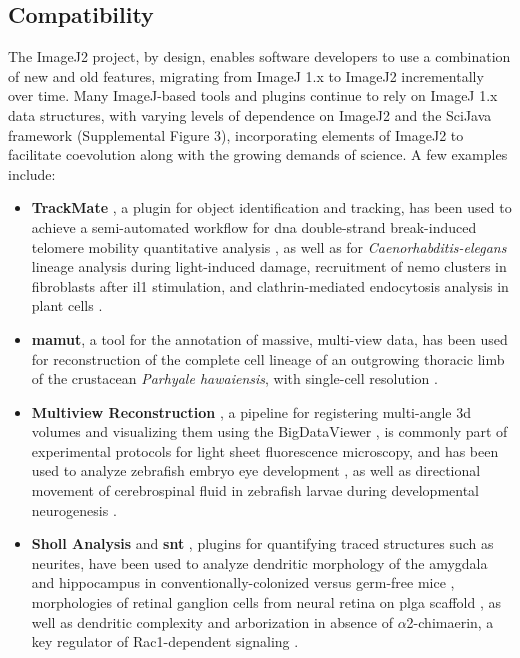 \documentclass{bmcart}
\begin{document}
\subsection*{Compatibility}
The ImageJ2 project, by design, enables software developers to use a
combination of new and old features, migrating from ImageJ 1.x to ImageJ2
incrementally over time. Many ImageJ-based tools and plugins continue to rely
on ImageJ 1.x data structures, with varying levels of dependence on ImageJ2 and
the SciJava framework (Supplemental Figure 3), incorporating elements of
ImageJ2 to facilitate coevolution along with the growing demands of science. A
few examples include:

\begin{itemize}
  \item \textbf{TrackMate} \cite{trackmate}, a plugin for object
    identification and tracking, has been used to achieve a semi-automated
    workflow for \acrfull{dna} double-strand break-induced telomere mobility
    quantitative analysis \cite{science_trackmate}, as well as for
    \textit{Caenorhabditis-elegans} lineage analysis during light-induced
    damage, recruitment of \acrfull{nemo} clusters in fibroblasts after
    \acrfull{il1} stimulation, and clathrin-mediated endocytosis analysis in
    plant cells \cite{trackmate}.
  \item \textbf{\acrfull{mamut}}, a tool for the annotation of massive,
    multi-view data, has been used for reconstruction of the complete cell
    lineage of an outgrowing thoracic limb of the crustacean \textit{Parhyale
    hawaiensis}, with single-cell resolution \cite{science_mamut}.
  \item \textbf{Multiview Reconstruction} \cite{multiview_2010,
    multiview_2014}, a pipeline for registering multi-angle \acrshort{3d}
    volumes and visualizing them using the BigDataViewer \cite{bigdataviewer},
    is commonly part of experimental protocols for light sheet fluorescence
    microscopy, and has been used to analyze zebrafish embryo eye development
    \cite{science_multiview_1}, as well as directional movement of
    cerebrospinal fluid in zebrafish larvae during developmental neurogenesis
    \cite{science_multiview_2}.
  \item \textbf{Sholl Analysis} \cite{sholl_analysis} and
    \textbf{\acrfull{snt}} \cite{simple_neurite_tracer}, plugins for
    quantifying traced structures such as neurites, have been used to analyze
    dendritic morphology of the amygdala and hippocampus in
    conventionally-colonized versus germ-free mice \cite{science_sholl_1},
    morphologies of retinal ganglion cells from neural retina on
    \acrfull{plga} scaffold \cite{science_sholl_2}, as well as dendritic
    complexity and arborization in absence of $\alpha$2-chimaerin, a key
    regulator of Rac1-dependent signaling \cite{science_sholl_3}.
\end{itemize}
\end{document}
